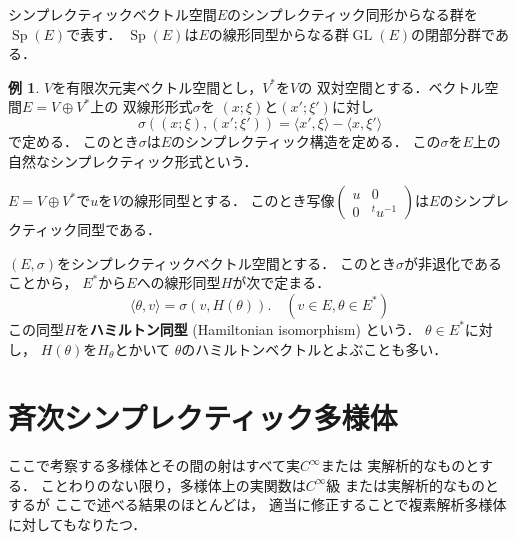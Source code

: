 \documentclass[leqno, 10pt, a4paper, dvipdfmx]{jsarticle}
\theoremstyle{definition}
\numberwithin{equation}{section}
\theoremstyle{mystyle}
\newtheorem{EG}[AXM]{例}
\def\inner<#1>{\langle #1 \rangle}
\newcommand{\GL}{\mathop{\mathrm{GL}}\nolimits}
\newcommand{\Sp}{\mathop{\mathrm{Sp}}\nolimits}
\begin{document}
シンプレクティックベクトル空間\(E\)のシンプレクティック同形からなる群を
\(\Sp(E)\)で表す．
\(\Sp(E)\)は\(E\)の線形同型からなる群\(\GL(E)\)の閉部分群である．

\begin{EG}
    \(V\)を有限次元実ベクトル空間とし，\(V^{\ast}\)を\(V\)の
    双対空間とする．ベクトル空間\(E=V\oplus V^{\ast}\)上の
    双線形形式\(\sigma\)を
    \((x;\xi)\)と\((x';\xi')\)に対し
    \begin{equation}\label{eq:A.1.1}
        \sigma((x;\xi),(x';\xi'))
        =\inner<x',\xi>-\inner<x,\xi'>
    \end{equation}
    で定める．
    このとき\(\sigma\)は\(E\)のシンプレクティック構造を定める．
    この\(\sigma\)を\(E\)上の自然なシンプレクティック形式という．
\end{EG}

\(E=V\oplus V^{\ast}\)で\(u\)を\(V\)の線形同型とする．
このとき写像\(\begin{pmatrix}
    u&0\\0&{}^{t}u^{-1}
\end{pmatrix}\)は\(E\)のシンプレクティック同型である．

\((E,\sigma)\)をシンプレクティックベクトル空間とする．
このとき\(\sigma\)が非退化であることから，
\(E^\ast\)から\(E\)への線形同型\(H\)が次で定まる．
\begin{equation}\label{eq:A.1.2}
    \inner<\theta,v>
    =
    \sigma(v,H(\theta)).
    \quad (v\in E, \theta\in E^{\ast})
\end{equation}
この同型\(H\)を\textbf{ハミルトン同型} (Hamiltonian isomorphism) という．
\(\theta\in E^{\ast}\)に対し，
\(H(\theta)\)を\(H_{\theta}\)とかいて
\(\theta\)のハミルトンベクトルとよぶことも多い．







\section{斉次シンプレクティック多様体}\label{sec:A.2}

ここで考察する多様体とその間の射はすべて実\(C^{\infty}\)または
実解析的なものとする．
ことわりのない限り，多様体上の実関数は\(C^{\infty}\)級
または実解析的なものとするが
ここで述べる結果のほとんどは，
適当に修正することで複素解析多様体に対してもなりたつ．
\end{document}
